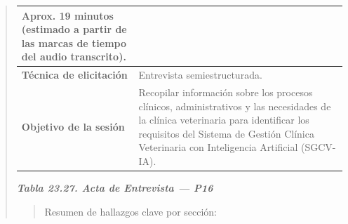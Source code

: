 \documentclass[
]{article}
\begin{document}
\begin{quote}
{\begin{longtable}[]{|
  >{\raggedright\arraybackslash}p{}|
  >{\raggedright\arraybackslash}p{}|}
\begin{minipage}[t]{\linewidth}
Aprox. 19 minutos (estimado a partir de las marcas de tiempo del audio transcrito).
\end{minipage} \\
\hline
\textbf{Técnica de elicitación} & \begin{minipage}[t]{\linewidth}\raggedright
Entrevista semiestructurada.
\end{minipage} \\
\hline
\textbf{Objetivo de la sesión} & \begin{minipage}[t]{\linewidth}\raggedright
Recopilar información sobre los procesos clínicos, administrativos y las necesidades de la clínica veterinaria para identificar los requisitos del Sistema de Gestión Clínica Veterinaria con Inteligencia Artificial (SGCV-IA).
\end{minipage} \\
\hline
\end{longtable}
}

\protect{}\label{_bookmark_P16_acta}{}\emph{\textbf{Tabla 23.27. Acta de Entrevista --- P16}}

\begin{quote}
Resumen de hallazgos clave por sección:
\end{quote}


\end{quote}
\end{document}
